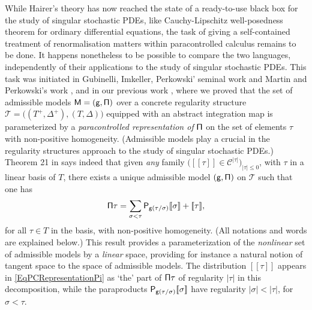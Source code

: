 \documentclass[JEP,XML,SOM,Unicode,published]{cedram}
\theoremstyle{plain}
\theoremstyle{definition}
\newcommand{\Brac}[1]{[\![#1]\!]}
\newcommand{\scrT}{\mathscr{T}}
\newcommand{\mcC}{\mathcal{C}}
\begin{document}
While Hairer's theory has now reached the state of a ready-to-use black box for the study of singular stochastic PDEs, like Cauchy-Lipschitz well-posedness theorem for ordinary differential equations, the task of giving a self-contained treatment of renormalisation matters within paracontrolled calculus remains to be done. It happens nonetheless to be possible to compare the two languages, independently of their applications to the study of singular stochastic PDEs. This task was initiated in Gubinelli, Imkeller, Perkowski' seminal work \cite{GIP} and Martin and Perkowski's work \cite{MP18}, and in our previous work \cite{BH}, where we proved that the set of admissible models $\sf M=(g,\Pi)$ over a concrete regularity structure $\scrT=\bigl((T^+,\Delta^+), (T,\Delta)\bigr)$ equipped with an abstract integration map is parameterized by a \emph{paracontrolled representation of} $\sf \Pi$ on the set of elements $\tau$ with non-positive homogeneity. (Admissible models play a crucial in the regularity structures approach to the study of singular stochastic PDEs.) Theorem 21 in \cite{BH} says indeed that given \emph{any} family $\bigl(\Brac{\tau}\in\mcC^{\vert\tau\vert}\bigr)_{\vert\tau\vert\leq 0}$, with $\tau$ in a linear basis of $T$, there exists a unique admissible model $\sf (g,\Pi)$ on $\mathscr{T}$ such that one has
\begin{equation} \label{EqPCRepresentationPi}
{\sf \Pi} \tau = \sum_{\sigma<\tau} {\sf P}_{{\sf g}(\tau/\sigma)}\Brac{\sigma} + \Brac{\tau},
\end{equation}
for all $\tau\in T$ in the basis, with non-positive homogeneity. (All notations and words are explained below.) This result provides a parameterization of the \emph{nonlinear} set of admissible models by a \emph{linear} space, providing for instance a natural notion of tangent space to the space of admissible models. The distribution $\Brac{\tau}$ appears in \eqref{EqPCRepresentationPi} as `the' part of ${\sf\Pi}\tau$ of regularity $\vert\tau\vert$ in this decomposition, while the paraproducts ${\sf P}_{{\sf g}(\tau/\sigma)}\Brac{\sigma}$ have regularity $\vert\sigma\vert<\vert\tau\vert$, for $\sigma<\tau$.
\end{document}
